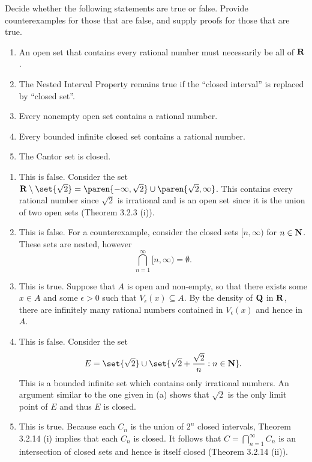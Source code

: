 \documentclass{lew98_solutions}
\begin{document}
\begin{exercise}
\label{ex:3.2.6}
    Decide whether the following statements are true or false. Provide counterexamples for those that are false, and supply proofs for those that are true.
    \begin{enumerate}
        \item An open set that contains every rational number must necessarily be all of \( \mathbf{R} \).

        \item The Nested Interval Property remains true if the ``closed interval'' is replaced by ``closed set''.

        \item Every nonempty open set contains a rational number.

        \item Every bounded infinite closed set contains a rational number.

        \item The Cantor set is closed.
    \end{enumerate}
\end{exercise}

\begin{solution}
    \begin{enumerate}
        \item This is false. Consider the set \( \R \setminus \set{ \sqrt{2} } = \paren{ -\infty, \sqrt{2} } \cup \paren{ \sqrt{2}, \infty } \). This contains every rational number since \( \sqrt{2} \) is irrational and is an open set since it is the union of two open sets (Theorem 3.2.3 (i)).
        
        \item This is false. For a counterexample, consider the closed sets \( [n, \infty) \) for \( n \in \mathbf{N} \). These sets are nested, however
        \[
            \bigcap_{n=1}^{\infty} [n, \infty) = \emptyset.
        \]

        \item This is true. Suppose that \( A \) is open and non-empty, so that there exists some \( x \in A \) and some \( \epsilon > 0 \) such that \( V_{\epsilon}(x) \subseteq A \). By the density of \( \mathbf{Q} \) in \( \mathbf{R} \), there are infinitely many rational numbers contained in \( V_{\epsilon}(x) \) and hence in \( A \).

        \item This is false. Consider the set
        \[
            E = \set{ \sqrt{2} } \cup \set{ \sqrt{2} + \frac{\sqrt{2}}{n} : n \in \N }.
        \]
        This is a bounded infinite set which contains only irrational numbers. An argument similar to the one given in  (a) shows that \( \sqrt{2} \) is the only limit point of \( E \) and thus \( E \) is closed.

        \item This is true. Because each \( C_n \) is the union of \( 2^n \) closed intervals, Theorem 3.2.14 (i) implies that each \( C_n \) is closed. It follows that \( C = \bigcap_{n=1}^{\infty} C_n \) is an intersection of closed sets and hence is itself closed (Theorem 3.2.14 (ii)).
    \end{enumerate}
\end{solution}
\end{document}
